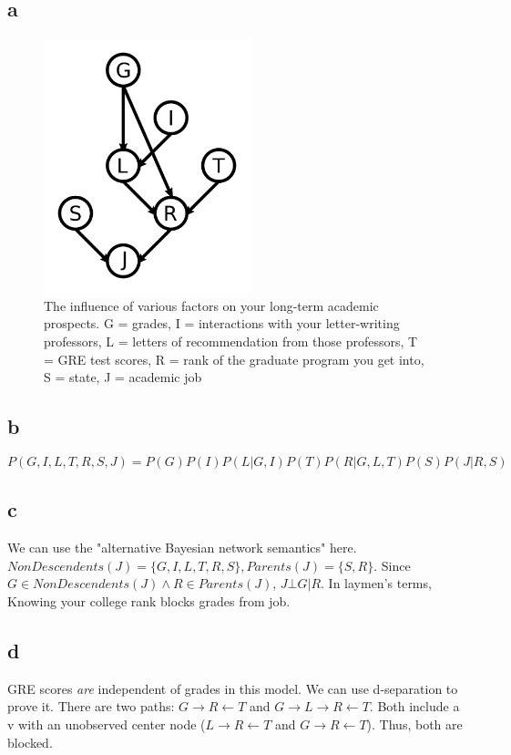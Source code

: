 \documentclass{article}
\begin{document}
\subsection{a}

\begin{figure}[!ht]
	\centering
	\includegraphics[width=60mm]{q5-graph.png}
	\caption{The influence of various factors on your long-term academic 
        prospects. 
        G = grades, 
        I = interactions with your letter-writing professors, 
        L = letters of recommendation from those professors, 
        T = GRE test scores, 
        R = rank of the graduate program you get into, 
        S = state, 
        J = academic job}
\end{figure}

\subsection{b}

$$
P(G, I, L, T, R, S, J) = P(G) P(I) P(L | G, I) P(T) P(R | G, L, T) P(S) P(J | R, S)
$$

\subsection{c}

We can use the "alternative Bayesian network semantics" here. $NonDescendents(J) = \{G, I, L, T, R, S\}, Parents(J) = \{S, R\}$. 
Since $G \in NonDescendents(J) \wedge R \in Parents(J) $, $J \bot G | R$. In laymen's terms, Knowing your college rank blocks grades 
from job.

\subsection{d}

GRE scores \textit{are} independent of grades in this model. We can use d-separation to prove it.
There are two paths: $ G \rightarrow R \leftarrow T $ and $ G \rightarrow L \rightarrow R \leftarrow T $. 
Both include a v with an unobserved center node ($ L \rightarrow R \leftarrow T $ and $ G \rightarrow R \leftarrow T $). 
Thus, both are blocked.
\end{document}
